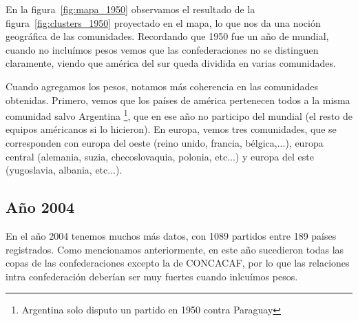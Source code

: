 \documentclass{article}
\begin{document}
En la figura~\ref{fig:mapa_1950} observamos el resultado de la figura~\ref{fig:clusters_1950} proyectado en el mapa, lo que nos da una noción geográfica de las comunidades. Recordando que 1950 fue un año de mundial,
cuando no incluímos pesos vemos que las confederaciones no se distinguen claramente, viendo que 
américa del sur queda dividida en varias comunidades.

Cuando agregamos los pesos, notamos más coherencia en las comunidades obtenidas. Primero, vemos que
los países de américa pertenecen todos a la misma comunidad salvo Argentina
\footnote{Argentina solo disputo un partido en 1950 contra Paraguay}, que en ese año no participo
del mundial (el resto de equipos américanos si lo hicieron). En europa, vemos tres comunidades, que se 
corresponden con europa del oeste (reino unido, francia, bélgica,...), europa central (alemania, suzia,
checoslovaquia, polonia, etc...) y europa del este (yugoslavia, albania, etc...).

\subsection{Año 2004}

En el año 2004 tenemos muchos más datos, con 1089 partidos entre 189 países registrados. Como mencionamos
anteriormente, en este año sucedieron todas las copas de las confederaciones excepto la de CONCACAF, por lo 
que las relaciones intra confederación deberían ser muy fuertes cuando inlcuímos pesos.
\end{document}
